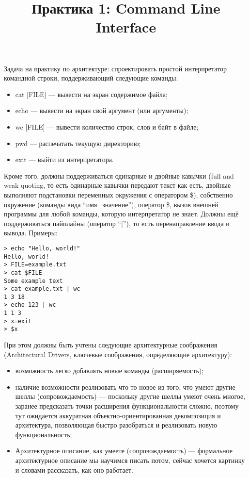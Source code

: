 \documentclass[a5paper]{article}
\title{Практика 1: Command Line Interface}
\date{}
\begin{document}
\maketitle
\thispagestyle{empty}

Задача на практику по архитектуре: спроектировать простой интерпретатор командной строки, поддерживающий следующие команды:

\begin{itemize}
    \item cat [FILE] --- вывести на экран содержимое файла;
    \item echo --- вывести на экран свой аргумент (или аргументы);
    \item wc [FILE] --- вывести количество строк, слов и байт в файле;
    \item pwd --- распечатать текущую директорию;
    \item exit --- выйти из интерпретатора.
\end{itemize}

Кроме того, должны поддерживаться одинарные и двойные кавычки (full and weak quoting, то есть одинарные кавычки передают текст как есть, двойные выполняют подстановки переменных окружения с оператором \$), собственно окружение (команды вида ``имя=значение''), оператор \$, вызов внешней программы для любой команды, которую интерпретатор не знает. Должны ещё поддерживаться пайплайны (оператор ``|''), то есть перенаправление ввода и вывода. Примеры:

\begin{verbatim}
> echo "Hello, world!"
Hello, world!
> FILE=example.txt
> cat $FILE
Some example text
> cat example.txt | wc
1 3 18
> echo 123 | wc
1 1 3
> x=exit
> $x
\end{verbatim}

При этом должны быть учтены следующие архитектурные соображения (Architectural Drivers, ключевые соображения, определяющие архитектуру):

\begin{itemize}
    \item возможность легко добавлять новые команды (расширяемость);
    \item наличие возможности реализовать что-то новое из того, что умеют другие шеллы (сопровождаемость) --- поскольку другие шеллы умеют очень многое, заранее предсказать точки расширения функциональности сложно, поэтому тут ожидается аккуратная объектно-ориентированная декомпозиция и архитектура, позволяющая быстро разобраться и реализовать новую функциональность;
    \item Архитектурное описание, как умеете (сопровождаемость) --- формальное архитектурное описание мы научимся писать потом, сейчас хочется картинку и словами рассказать, как оно работает.
\end{itemize}
\end{document}
